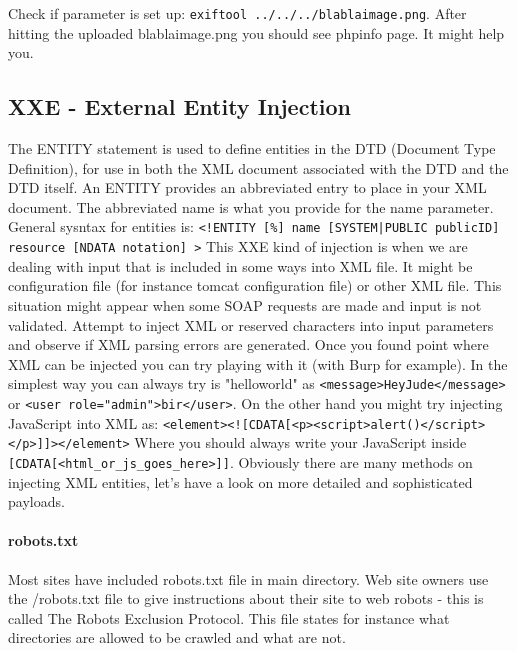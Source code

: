 \documentclass{article}[12pt]
\newcommand{\q}[1]{\texttt{#1}}
\begin{document}
Check if parameter is set up: \q{exiftool ../../../blablaimage.png}.
After hitting the uploaded blablaimage.png you should see phpinfo page.
It might help you.

\subsection{XXE - External Entity Injection}
The ENTITY statement is used to define entities in the DTD (Document Type Definition), for use in both the XML document associated with the DTD and the DTD itself.
An ENTITY provides an abbreviated entry to place in your XML document.
The abbreviated name is what you provide for the name parameter.
General sysntax for entities is: \newline
\q{<!ENTITY [\%] name [SYSTEM|PUBLIC publicID] resource [NDATA notation] >} \newline
This XXE kind of injection is when we are dealing with input that is included in some ways into XML file.
It might be configuration file (for instance tomcat configuration file) or other XML file.
This situation might appear when some SOAP requests are made and input is not validated.
Attempt to inject XML or reserved characters into input parameters and observe if XML parsing errors are generated.
Once you found point where XML can be injected you can try playing with it (with Burp for example).
In the simplest way you can always try is "helloworld" as \q{<message>HeyJude</message>} or \q{<user role="admin">bir</user>}.
On the other hand you might try injecting JavaScript into XML as: \q{<element><![CDATA[<p><script>alert()</script></p>]]></element>}
Where you should always write your JavaScript inside \q{[CDATA[<html\_or\_js\_goes\_here>]]}.
Obviously there are many methods on injecting XML entities, let's have a look on more detailed and sophisticated payloads.\newline
\paragraph{robots.txt}
Most sites have included robots.txt file in main directory.
Web site owners use the /robots.txt file to give instructions about their site to web robots - this is called The Robots Exclusion Protocol.
This file states for instance what directories are allowed to be crawled and what are not.
\end{document}
